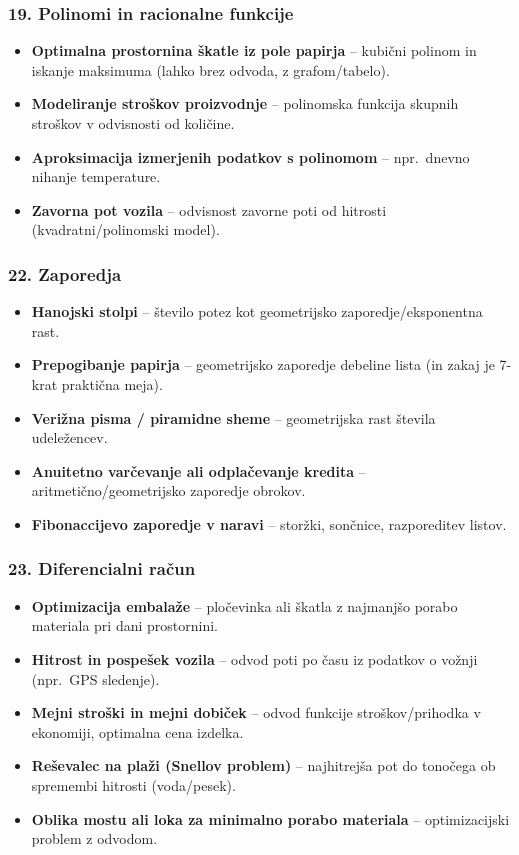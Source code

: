 \documentclass[11pt,a4paper]{article}
\begin{document}
\subsubsection*{19. Polinomi in racionalne funkcije}
\begin{itemize}
  \item \textbf{Optimalna prostornina škatle iz pole papirja} -- kubični polinom in iskanje maksimuma (lahko brez odvoda, z grafom/tabelo).
  \item \textbf{Modeliranje stroškov proizvodnje} -- polinomska funkcija skupnih stroškov v odvisnosti od količine.
  \item \textbf{Aproksimacija izmerjenih podatkov s polinomom} -- npr.\ dnevno nihanje temperature.
  \item \textbf{Zavorna pot vozila} -- odvisnost zavorne poti od hitrosti (kvadratni/polinomski model).
\end{itemize}

\subsubsection*{22. Zaporedja}
\begin{itemize}
  \item \textbf{Hanojski stolpi} -- število potez kot geometrijsko zaporedje/eksponentna rast.
  \item \textbf{Prepogibanje papirja} -- geometrijsko zaporedje debeline lista (in zakaj je 7-krat praktična meja).
  \item \textbf{Verižna pisma / piramidne sheme} -- geometrijska rast števila udeležencev.
  \item \textbf{Anuitetno varčevanje ali odplačevanje kredita} -- aritmetično/geometrijsko zaporedje obrokov.
  \item \textbf{Fibonaccijevo zaporedje v naravi} -- storžki, sončnice, razporeditev listov.
\end{itemize}

\subsubsection*{23. Diferencialni račun}
\begin{itemize}
  \item \textbf{Optimizacija embalaže} -- pločevinka ali škatla z najmanjšo porabo materiala pri dani prostornini.
  \item \textbf{Hitrost in pospešek vozila} -- odvod poti po času iz podatkov o vožnji (npr.\ GPS sledenje).
  \item \textbf{Mejni stroški in mejni dobiček} -- odvod funkcije stroškov/prihodka v ekonomiji, optimalna cena izdelka.
  \item \textbf{Reševalec na plaži (Snellov problem)} -- najhitrejša pot do tonočega ob spremembi hitrosti (voda/pesek).
  \item \textbf{Oblika mostu ali loka za minimalno porabo materiala} -- optimizacijski problem z odvodom.
\end{itemize}
\end{document}
